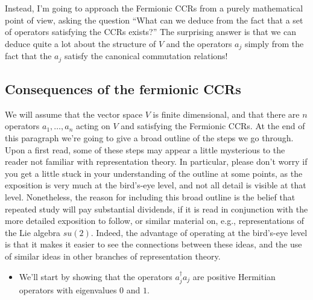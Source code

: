 \documentclass[12pt]{article}
\begin{document}
{Instead, I'm going to approach the Fermionic CCRs from a purely
mathematical point of view, asking the question ``What can we deduce
from the fact that a set of operators satisfying the CCRs exists?''
The surprising answer is that we can deduce quite a lot about the
structure of $V$ and the operators $a_j$ simply from the fact that the
$a_j$ satisfy the canonical commutation relations!




\subsection{Consequences of the fermionic CCRs}

We will assume that the vector space $V$ is finite dimensional, and
that there are $n$ operators $a_1,\ldots,a_n$ acting on $V$ and
satisfying the Fermionic CCRs.  At the end of this paragraph we're
going to give a broad outline of the steps we go through.  Upon a
first read, some of these steps may appear a little mysterious to the
reader not familiar with representation theory.  In particular, please
don't worry if you get a little stuck in your understanding of the
outline at some points, as the exposition is very much at the
bird's-eye level, and not all detail is visible at that level.
Nonetheless, the reason for including this broad outline is the belief
that repeated study will pay substantial dividends, if it is read in
conjunction with the more detailed exposition to follow, or similar
material on, e.g., representations of the Lie algebra $su(2)$.
Indeed, the advantage of operating at the bird's-eye level is that it
makes it easier to see the connections between these ideas, and the
use of similar ideas in other branches of representation theory.
\begin{itemize}
\item We'll start by showing that the operators $a_j^\dagger a_j$ are
  positive Hermitian operators with eigenvalues $0$ and $1$.
  

\end{itemize}}
\end{document}
